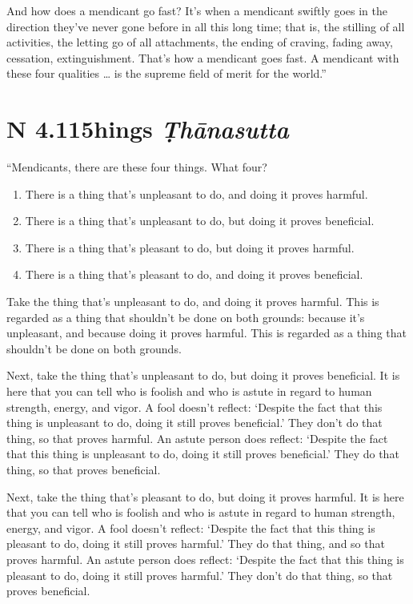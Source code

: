 \documentclass[12pt,openany]{book}%
\newcommand*{\suttatitleacronym}[1]{\smaller[2]{#1}\vspace*{.3em}}
\newcommand*{\suttatitletranslation}[1]{\linebreak{#1}}
\newcommand*{\suttatitleroot}[1]{\linebreak\smaller[2]\itshape{#1}}
\newcommand*{\tocacronym}[1]{\hspace*{-3.3em}{#1}\quad}
\newcommand*{\toctranslation}[1]{#1}
\newcommand*{\tocroot}[1]{(\textit{#1})}
\begin{document}
And how does a mendicant go fast? It’s when a mendicant swiftly goes in the direction they’ve never gone before in all this long time; that is, the stilling of all activities, the letting go of all attachments, the ending of craving, fading away, cessation, extinguishment. That’s how a mendicant goes fast. A mendicant with these four qualities … is the supreme field of merit for the world.” 

%
\section*{{\suttatitleacronym AN 4.115}{\suttatitletranslation Things }{\suttatitleroot Ṭhānasutta}}
\addcontentsline{toc}{section}{\tocacronym{AN 4.115} \toctranslation{Things } \tocroot{Ṭhānasutta}}

“Mendicants, there are these four things. What four? 

\begin{enumerate}%
\item There is a thing that’s unpleasant to do, and doing it proves harmful. %
\item There is a thing that’s unpleasant to do, but doing it proves beneficial. %
\item There is a thing that’s pleasant to do, but doing it proves harmful. %
\item There is a thing that’s pleasant to do, and doing it proves beneficial. %
\end{enumerate}

Take the thing that’s unpleasant to do, and doing it proves harmful. This is regarded as a thing that shouldn’t be done on both grounds: because it’s unpleasant, and because doing it proves harmful. This is regarded as a thing that shouldn’t be done on both grounds. 

Next, take the thing that’s unpleasant to do, but doing it proves beneficial. It is here that you can tell who is foolish and who is astute in regard to human strength, energy, and vigor. A fool doesn’t reflect: ‘Despite the fact that this thing is unpleasant to do, doing it still proves beneficial.’ They don’t do that thing, so that proves harmful. An astute person does reflect: ‘Despite the fact that this thing is unpleasant to do, doing it still proves beneficial.’ They do that thing, so that proves beneficial. 

Next, take the thing that’s pleasant to do, but doing it proves harmful. It is here that you can tell who is foolish and who is astute in regard to human strength, energy, and vigor. A fool doesn’t reflect: ‘Despite the fact that this thing is pleasant to do, doing it still proves harmful.’ They do that thing, and so that proves harmful. An astute person does reflect: ‘Despite the fact that this thing is pleasant to do, doing it still proves harmful.’ They don’t do that thing, so that proves beneficial. 
\end{document}
